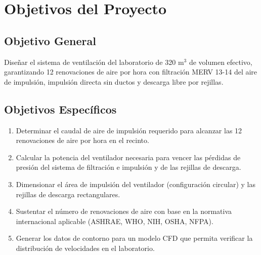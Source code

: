 \section{Objetivos del Proyecto}

\subsection{Objetivo General}

Diseñar el sistema de ventilación del laboratorio de 320 m$^3$ de volumen efectivo, garantizando 12 renovaciones de aire por hora con filtración MERV 13-14 del aire de impulsión, impulsión directa sin ductos y descarga libre por rejillas.

\subsection{Objetivos Específicos}

\begin{enumerate}
	\item Determinar el caudal de aire de impulsión requerido para alcanzar las 12 renovaciones de aire por hora en el recinto.
	\item Calcular la potencia del ventilador necesaria para vencer las pérdidas de presión del sistema de filtración e impulsión y de las rejillas de descarga.
	\item Dimensionar el área de impulsión del ventilador (configuración circular) y las rejillas de descarga rectangulares.
	\item Sustentar el número de renovaciones de aire con base en la normativa internacional aplicable (ASHRAE, WHO, NIH, OSHA, NFPA).
	\item Generar los datos de contorno para un modelo CFD que permita verificar la distribución de velocidades en el laboratorio.
\end{enumerate}
